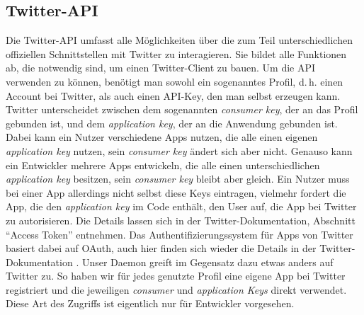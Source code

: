 \subsection{Twitter-API}
\label{sssection:twitter-api}
Die Twitter-API umfasst alle Möglichkeiten über die zum Teil unterschiedlichen offiziellen Schnittstellen mit Twitter zu interagieren.
Sie bildet alle Funktionen ab, die notwendig sind, um einen Twitter-Client zu bauen.
Um die API verwenden zu können, benötigt man sowohl ein sogenanntes Profil, d.\,h. einen Account bei Twitter, als auch einen API-Key, den man selbst erzeugen kann.
Twitter unterscheidet zwischen dem sogenannten \textit{consumer key}, der an das Profil gebunden ist, und dem \textit{application key}, der an die Anwendung gebunden ist.
Dabei kann ein Nutzer verschiedene Apps nutzen, die alle einen eigenen \textit{application key} nutzen, sein \textit{consumer key} ändert sich aber nicht.
Genauso kann ein Entwickler mehrere Apps entwickeln, die alle einen unterschiedlichen \textit{application key} besitzen, sein \textit{consumer key} bleibt aber gleich.
Ein Nutzer muss bei einer App allerdings nicht selbst diese Keys eintragen, vielmehr fordert die App, die den \textit{application key} im Code enthält, den User auf, die App bei Twitter zu autorisieren.
Die Details lassen sich in der Twitter-Dokumentation, Abschnitt "`Access Token"' \cite{TwitterAccessTokens2014} entnehmen.
Das Authentifizierungssystem für Apps von Twitter basiert dabei auf  OAuth, auch hier finden sich wieder die Details in der Twitter-Dokumentation \cite{TwitterOAuth2014}.
Unser Daemon greift im Gegensatz dazu etwas anders auf Twitter zu.
So haben wir für jedes genutzte Profil eine eigene App bei Twitter registriert und die jeweiligen \textit{consumer} und \textit{application Keys} direkt verwendet.
Diese Art des Zugriffs ist eigentlich nur für Entwickler vorgesehen.

